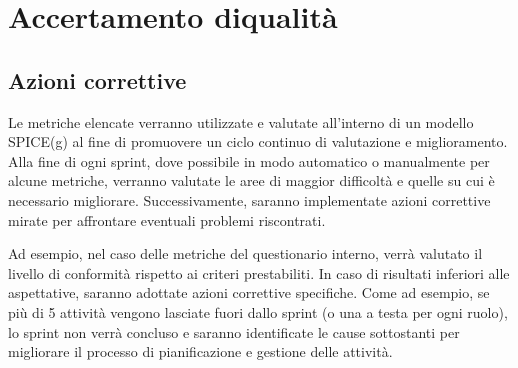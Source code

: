 \section{Accertamento diqualità}










\subsection{Azioni correttive}
Le metriche elencate verranno utilizzate e valutate all'interno di un modello SPICE(g) al fine di promuovere un ciclo continuo di valutazione e miglioramento. Alla fine di ogni sprint, dove possibile in modo automatico o manualmente per alcune metriche, verranno valutate le aree di maggior difficoltà e quelle su cui è necessario migliorare. Successivamente, saranno implementate azioni correttive mirate per affrontare eventuali problemi riscontrati.

Ad esempio, nel caso delle metriche del questionario interno, verrà valutato il livello di conformità rispetto ai criteri prestabiliti. In caso di risultati inferiori alle aspettative, saranno adottate azioni correttive specifiche. Come ad esempio, se più di 5 attività vengono lasciate fuori dallo sprint (o una a testa per ogni ruolo), lo sprint non verrà concluso e saranno identificate le cause sottostanti per migliorare il processo di pianificazione e gestione delle attività.

